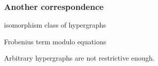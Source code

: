 \begin{frame}
    \frametitle{Another correspondence}

    \centering

    \begin{minipage}{0.45\textwidth}
        \begin{center}
            isomorphism class of hypergraphs

            \vspace{1em}

        \end{center}
    \end{minipage}
    \quad
    \raisebox{-1em}{\(\leftrightarrow\)}
    \await
    \begin{minipage}{0.45\textwidth}
        \begin{center}
            Frobenius term modulo equations

            \vspace{1em}

        \end{center}
    \end{minipage}

    \vspace{1em}
    \normalsize
    \scalebox{0.75}{\hypergraphpeople}

    \Large
    \await
    Arbitrary hypergraphs are \alert{not restrictive enough}.
\end{frame}
